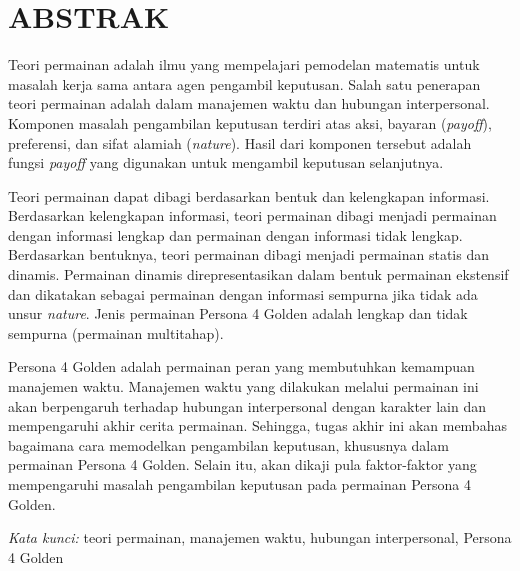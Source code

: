 \chapter*{ABSTRAK}

Teori permainan adalah ilmu yang mempelajari pemodelan matematis untuk masalah kerja sama antara agen pengambil keputusan. Salah satu penerapan teori permainan adalah dalam manajemen waktu dan hubungan interpersonal. Komponen masalah pengambilan keputusan terdiri atas aksi, bayaran (\textit{payoff}), preferensi, dan sifat alamiah (\textit{nature}). Hasil dari komponen tersebut adalah fungsi \textit{payoff} yang digunakan untuk mengambil keputusan selanjutnya.

Teori permainan dapat dibagi berdasarkan bentuk dan kelengkapan informasi. Berdasarkan kelengkapan informasi, teori permainan dibagi menjadi permainan dengan informasi lengkap dan permainan dengan informasi tidak lengkap. Berdasarkan bentuknya, teori permainan dibagi menjadi permainan statis dan dinamis. Permainan dinamis direpresentasikan dalam bentuk permainan ekstensif dan dikatakan sebagai permainan dengan informasi sempurna jika tidak ada unsur \textit{nature}. Jenis permainan Persona 4 Golden adalah lengkap dan tidak sempurna (permainan multitahap).

Persona 4 Golden adalah permainan peran yang membutuhkan kemampuan manajemen waktu. Manajemen waktu yang dilakukan melalui permainan ini akan berpengaruh terhadap hubungan interpersonal dengan karakter lain dan mempengaruhi akhir cerita permainan. Sehingga, tugas akhir ini akan membahas bagaimana cara memodelkan pengambilan keputusan, khususnya dalam permainan Persona 4 Golden. Selain itu, akan dikaji pula faktor-faktor yang mempengaruhi masalah pengambilan keputusan pada permainan Persona 4 Golden.

\textit{Kata kunci:} teori permainan, manajemen waktu, hubungan interpersonal, Persona 4 Golden
